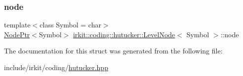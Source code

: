 \subsubsection{\texorpdfstring{node}{node}}
{\footnotesize\ttfamily template$<$class Symbol = char$>$ \\
\mbox{\hyperlink{namespaceirkit_1_1coding_1_1hutucker_a3fd5bcbd5c6d608f75e0afbb7f171899}{Node\+Ptr}}$<$Symbol$>$ \mbox{\hyperlink{structirkit_1_1coding_1_1hutucker_1_1LevelNode}{irkit\+::coding\+::hutucker\+::\+Level\+Node}}$<$ Symbol $>$\+::node}



The documentation for this struct was generated from the following file\+:\begin{DoxyCompactItemize}
\item 
include/irkit/coding/\mbox{\hyperlink{hutucker_8hpp}{hutucker.\+hpp}}\end{DoxyCompactItemize}
